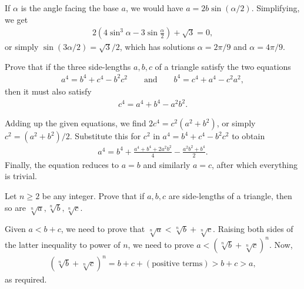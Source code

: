 \begin{solution}
    If $\alpha$ is the angle facing the base $a$, we would have $a= 2b \sin(\alpha/2)$. Simplifying, we get
    \begin{align*}
        2\left(4\sin^3 \alpha - 3\sin \frac{\alpha}{2}\right) + \sqrt{3} = 0,
    \end{align*}
    or simply $\sin(3\alpha/2)=\sqrt{3}/2$, which has solutions $\alpha=2\pi/9$ and $\alpha=4\pi/9$.
\end{solution}

\begin{question}
    Prove that if the three side-lengths $a,b,c$ of a triangle satisfy the two equations
    \begin{align*}
        a^4 = b^4 + c^4 - b^2c^2 \qquad \text{and} \qquad b^4 = c^4 + a^4 - c^2a^2,
    \end{align*}
    then it must also satisfy
    \begin{align*}
        c^4=a^4+b^4-a^2b^2.
    \end{align*}
\end{question}

\begin{solution}
    Adding up the given equations, we find $2c^4=c^2(a^2+b^2)$, or simply $c^2=(a^2+b^2)/2$. Substitute this for $c^2$ in $a^4 = b^4 + c^4 - b^2c^2$ to obtain
    \begin{align*}
        a^4 = b^4 + \frac{a^4+b^4+2a^2b^2}{4}-\frac{a^2b^2+b^4}{2}.
    \end{align*}
    Finally, the equation reduces to $a=b$ and similarly $a=c$, after which everything is trivial.
\end{solution}


\begin{question}
    Let $n\geq 2$ be any integer. Prove that if $a,b,c$ are side-lengths of a triangle, then so are $\sqrt[n]{a}, \sqrt[n]{b}, \sqrt[n]{c}$.
\end{question}

\begin{solution}
    Given $a<b+c$, we need to prove that $\sqrt[n]{a}<\sqrt[n]{b}+\sqrt[n]{c}$. Raising both sides of the latter inequality to power of $n$, we need to prove $a < \left(\sqrt[n]{b}+\sqrt[n]{c}\right)^n$. Now,
    \begin{align*}
        \left(\sqrt[n]{b}+\sqrt[n]{c}\right)^n = b+c + (\text{positive terms}) > b+c > a,
    \end{align*}
    as required.
\end{solution}


